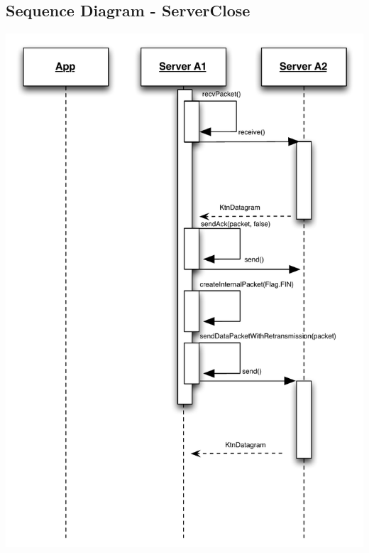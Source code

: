 \documentclass{article}
\begin{document}
\subsection{Sequence Diagram - ServerClose}
\includegraphics[scale=0.95]{ktnServerClose.pdf}
\end{document}
